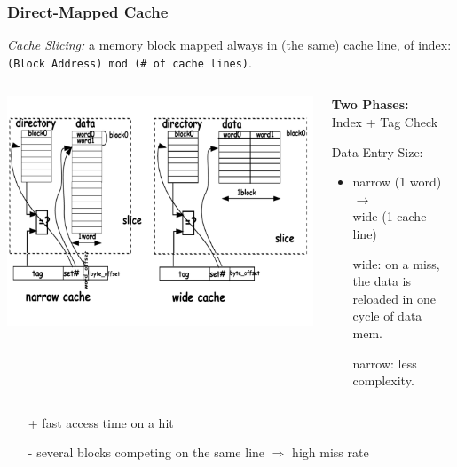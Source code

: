\documentclass{beamer}
\renewcommand{\emph}[1]{\textcolor{structure}{#1}}
\newcommand{\emp}[1]{\textcolor{DikuRed}{ #1}}
\begin{document}
\begin{frame}[fragile,t]
\frametitle{Direct-Mapped Cache}
 
{\em Cache Slicing:} a memory block mapped always in (the same) cache line, of index:
{\tt (Block Address) mod (\# of cache lines)}.\bigskip
\vspace{-3ex}
\begin{columns}
\includegraphics[width=44ex]{Figures/FigsMemH/CacheWide}
\begin{scriptsize}
{\bf Two Phases:}\\
\emp{Index} + \emph{Tag Check}
\bigskip

\emp{Data-Entry Size:}\\ 
\begin{itemize}
    \item narrow (1 word) $\rightarrow$\\wide (1 cache line)
    \item[wide:] on a miss, the data is reloaded in one cycle of data mem.
    \item[narrow:] less complexity.
\end{itemize} 
\end  {scriptsize}
\end{columns}

\begin{itemize}
    \item[\emph{+}]  fast access time on a hit
    \item[\alert{-}] several blocks competing on the same line $\Rightarrow$ high miss rate 
\end  {itemize}

\end{frame}
\end{document}
